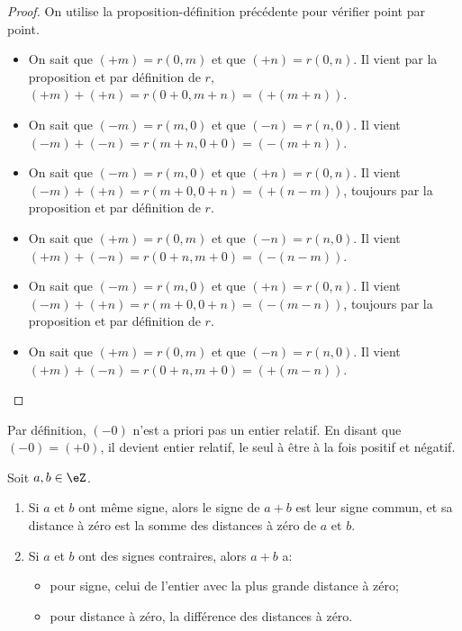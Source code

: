 \begin{proof}
	On utilise la proposition-définition précédente pour vérifier point par point.
 	\begin{itemize}
  		\item
			On sait que \( (+m) = r(0,m) \) et que \( (+n) = r(0,n) \). Il vient par la proposition et par définition de \( r \), \( (+m) + (+n) = r(0+0, m+n) = (+ (m+n) )\).
  		\item
			On sait que \( (-m) = r(m,0) \) et que \( (-n) = r(n,0) \). Il vient \( (-m) + (-n) = r(m+n,0+0) = (- (m+n) )\).
   		\item
			On sait que \( (-m) = r(m,0) \) et que \( (+n) = r(0,n) \). Il vient \( (-m) + (+n) = r(m+0,0+n) = (+(n-m) )\), toujours par la proposition et par définition de \( r \).
    	\item
			On sait que \( (+m) = r(0,m) \) et que \( (-n) = r(n,0) \). Il vient \( (+m) + (-n) = r(0+n, m+0) = (- (n-m) )\).
   		\item
			On sait que \( (-m) = r(m,0) \) et que \( (+n) = r(0,n) \). Il vient \( (-m) + (+n) = r(m+0,0+n) = (-(m-n) )\), toujours par la proposition et par définition de \( r \).
    	\item
			On sait que \( (+m) = r(0,m) \) et que \( (-n) = r(n,0) \). Il vient \( (+m) + (-n) = r(0+n, m+0) = (+(m-n) )\).
  	\end{itemize}
\end{proof}

\begin{normaltext}	\label{NORooRelatifsMoinsZero}
	Par définition, \( (-0) \) n'est a priori pas un entier relatif. En disant que \( (-0) = (+0) \), il devient entier relatif, le seul à être à la fois positif et négatif.
\end{normaltext}

\begin{corollary}	\label{CORooEntiersRelatifsRegleSignesSimple}
	Soit \( a, b \in \eZ \).
 	\begin{enumerate}
  		\item	\label{ITEMooEntiersRelatifsSommeMemeSigne}
			Si \( a \) et \( b \) ont même signe, alors le signe de \( a+b \) est leur signe commun, et sa distance à zéro est la somme des distances à zéro de \( a \) et \( b \).
   		\item	\label{ITEMooEntiersRelatifsSommeSignesContraires}
	 		Si \( a \) et \( b \) ont des signes contraires, alors \( a+b \) a:
			\begin{itemize}
   				\item pour signe, celui de l'entier avec la plus grande distance à zéro;
	   			\item pour distance à zéro, la différence des distances à zéro.
	   		\end{itemize}
	  \end{enumerate}
\end{corollary}

